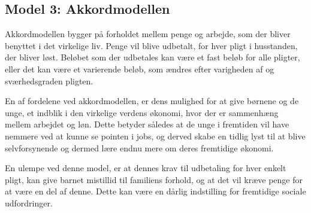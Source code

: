 

\subsection{Model 3: Akkordmodellen}
Akkordmodellen bygger på forholdet mellem penge 
og arbejde, som der bliver benyttet i det 
virkelige liv. Penge vil blive udbetalt, for 
hver pligt i husstanden, der bliver løst. 
Beløbet som der udbetales kan være et fast beløb 
for alle pligter, eller det kan være et 
varierende beløb, som ændres efter varigheden af 
og sværhedsgraden pligten.

En af fordelene ved akkordmodellen, er dens 
mulighed for at give børnene og de unge, et 
indblik i den virkelige verdens økonomi, hvor 
der er sammenhæng mellem arbejdet og løn. Dette 
betyder således at de unge i fremtiden vil have 
nemmere ved at kunne se pointen i jobs, og 
derved skabe en tidlig lyst til at blive 
selvforsynende og dermed lære endnu mere om 
deres fremtidige økonomi.

En ulempe ved denne model, er at dennes krav til 
udbetaling for hver enkelt pligt, kan give 
barnet mistillid til familiens forhold, og at 
det vil kræve penge for at være en del af denne. 
Dette kan være en dårlig indstilling for 
fremtidige sociale udfordringer.


